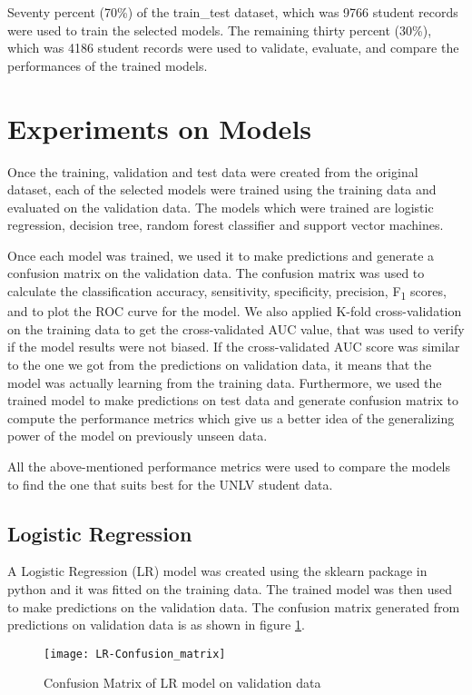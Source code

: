 \documentclass[11pt,openright]{report}
\begin{document}
Seventy percent (70\%) of the train\_test dataset, which was 9766 student records were used to train the selected models. The remaining thirty percent (30\%), which was 4186 student records were used to validate, evaluate, and compare the performances of the trained models. 

\section {Experiments on Models}
Once the training, validation and test data were created from the original dataset, each of the selected models were trained using the training data and evaluated on the validation data. The models which were trained are logistic regression, decision tree, random forest classifier and support vector machines. 

Once each model was trained, we used it to make predictions and generate a confusion matrix on the validation data. The confusion matrix was used to calculate the classification accuracy, sensitivity, specificity, precision, F\textsubscript{1} scores, and to plot the ROC curve for the model. We also applied K-fold cross-validation on the training data to get the cross-validated AUC value, that was used to verify if the model results were not biased. If the cross-validated AUC score was similar to the one we got from the predictions on validation data, it means that the model was actually learning from the training data. Furthermore, we used the trained model to make predictions on test data and generate confusion matrix to compute the performance metrics which give us a better idea of the generalizing power of the model on previously unseen data.  

All the above-mentioned performance metrics were used to compare the models to find the one that suits best for the UNLV student data. 

\subsection {Logistic Regression}
A Logistic Regression (LR) model was created using the sklearn package in python and it was fitted on the training data. The trained model was then used to make predictions on the validation data. The confusion matrix generated from predictions on validation data is as shown in figure \ref{fig:lr_confusion_matrix}.

  \begin{figure}[!htb]
	\centering
	\texttt{[image: LR-Confusion\_matrix]}
	\caption{Confusion Matrix of LR model on validation data}
	\label{fig:lr_confusion_matrix}
\end{figure} 
\end{document}
